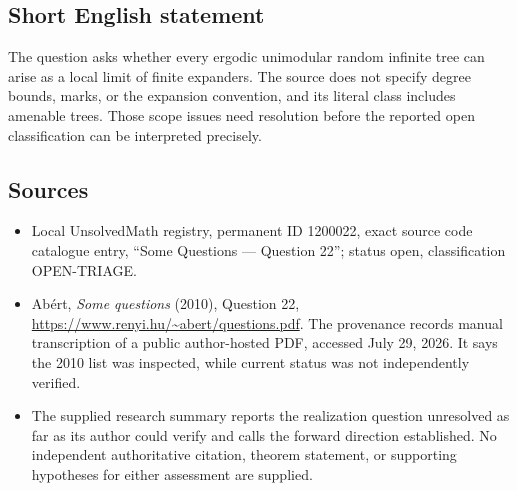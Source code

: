 \documentclass[11pt]{article}
\begin{document}
\subsection{Short English statement}
The question asks whether every ergodic unimodular random infinite tree can arise as a local limit of finite expanders. The source does not specify degree bounds, marks, or the expansion convention, and its literal class includes amenable trees. Those scope issues need resolution before the reported open classification can be interpreted precisely.
\subsection{Sources}
\begin{itemize}
\item Local UnsolvedMath registry, permanent ID 1200022, exact source code catalogue entry, ``Some Questions --- Question 22''; status open, classification OPEN-TRIAGE.
\item Ab\'ert, \emph{Some questions} (2010), Question 22, \url{https://www.renyi.hu/~abert/questions.pdf}. The provenance records manual transcription of a public author-hosted PDF, accessed July 29, 2026. It says the 2010 list was inspected, while current status was not independently verified.
\item The supplied research summary reports the realization question unresolved as far as its author could verify and calls the forward direction established. No independent authoritative citation, theorem statement, or supporting hypotheses for either assessment are supplied.
\end{itemize}
\end{document}
